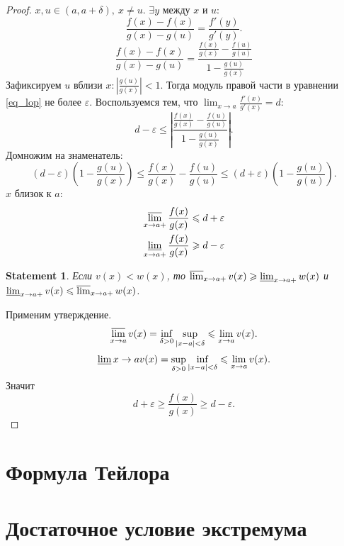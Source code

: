 \documentclass[11pt]{book}
\renewcommand{\le}{\leqslant}
\renewcommand{\ge}{\geqslant}
\theoremstyle{definition}
\theoremstyle{plain}
\theoremstyle{plain}
\newtheorem*{st}{Statement}
\theoremstyle{definition}
\theoremstyle{remark}
\begin{document}
\begin{proof}
    $ x, u \in (a, a + \delta ), ~ x \ne  u$. $ \exists y$ между $ x$ и $ u$:
    \[
	\frac{f(x) - f(x)}{g(x) - g(u)} = \frac{f'(y)}{g'(y)}
    .\] 
    \begin{equation}\label{eq_lop}
	\frac{f(x) - f(x)}{g(x) - g(u)} = \frac{\frac{f(x)}{g(x)} - \frac{f(u)}{g(u)}}{1 - \frac{g(u)}{g(x)}}
    \end{equation}
    Зафиксируем $ u$ вблизи $ x: \left| \frac{g(u)}{g(x)} \right| < 1$.
    Тогда модуль правой части в уравнении  \ref{eq_lop} не более  $ \varepsilon $.
    Воспользуемся тем, что $ \lim_{x \to a} \frac{f'(x)}{g'(x)} = d $:
    \[
    d - \varepsilon  \le \left|
	\frac{\frac{f(x)}{g(x)} - \frac{f(u)}{g(u)}}{1 - \frac{g(u)}{g(x)}}\right|
    .\] 
    Домножим на знаменатель:
    \[
	(d- \varepsilon ) (1- \frac{g(u)}{g(x)}) \le \frac{f(x)}{g(x)} - \frac{f(u)}{g(u)} \le (d+ \varepsilon ) \left(1 - \frac{g(u)}{g(u)}\right)
    .\] 
    $ x$ близок к $ a$:
    \begin{align*}
	\varlimsup_{x \to  a+} \frac{f(x)}{g(x)} &\le d + \varepsilon \\
	\varliminf_{x \to a + } \frac{f(x)}{g(x)} &\ge d - \varepsilon  
    \end{align*}
    \begin{st}
	Если $ v(x) < w(x)$, то  $ \varlimsup_{x \to a+}v(x) \ge \varliminf_{x \to  a + } w(x)$ и $ \varliminf_{x \to  a+} v(x) \le \varlimsup_{x \to  a +}w(x)$.
    \end{st}
    Применим утверждение. 
    \[
	\varlimsup_{x \to  a} v(x) = \inf_{\delta>0}\sup_{|x - a| < \delta } \le \lim_{x \to  a}  v(x)
    .\] 
    \[
	\varliminf{x \to  a} v(x) = \sup_{\delta>0}\inf_{|x - a| < \delta } \le \lim_{x \to  a}  v(x)
    .\] 
    Значит
     \[
	 d + \varepsilon  \ge \frac{f(x)}{g(x)} \ge d - \varepsilon 
    .\] 
\end{proof}
\section{Формула Тейлора}
\section{Достаточное условие экстремума}
\end{document}
